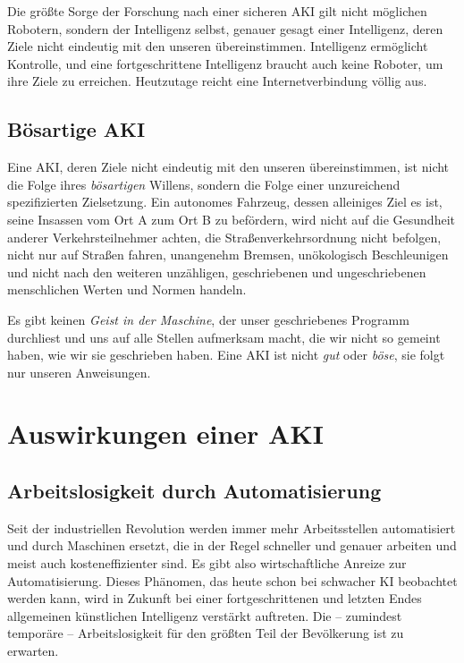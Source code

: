 Die größte Sorge der Forschung nach einer sicheren AKI gilt nicht möglichen Robotern, sondern der Intelligenz selbst, genauer gesagt einer Intelligenz, deren Ziele nicht eindeutig mit den unseren übereinstimmen. Intelligenz ermöglicht Kontrolle, und eine fortgeschrittene Intelligenz braucht auch keine Roboter, um ihre Ziele zu erreichen. Heutzutage reicht eine Internetverbindung völlig aus. 
\subsection{Bösartige AKI} \label{bösartigeKI}
Eine AKI, deren Ziele nicht eindeutig mit den unseren übereinstimmen, ist nicht die Folge ihres \emph{bösartigen} Willens, sondern die Folge einer unzureichend spezifizierten Zielsetzung. Ein autonomes Fahrzeug, dessen alleiniges Ziel es ist, seine Insassen vom Ort A zum Ort B zu befördern, wird nicht auf die Gesundheit anderer Verkehrsteilnehmer achten, die Straßenverkehrsordnung nicht befolgen, nicht nur auf Straßen fahren, unangenehm Bremsen, unökologisch Beschleunigen und nicht nach den weiteren unzähligen, geschriebenen und ungeschriebenen menschlichen Werten und Normen handeln.

Es gibt keinen \emph{Geist in der Maschine}, der unser geschriebenes Programm durchliest und uns auf alle Stellen aufmerksam macht, die wir nicht so gemeint haben, wie wir sie geschrieben haben. Eine AKI ist nicht \emph{gut} oder \emph{böse}, sie folgt nur unseren Anweisungen. 

\section{Auswirkungen einer AKI}
\subsection{Arbeitslosigkeit durch Automatisierung}
Seit der industriellen Revolution werden immer mehr Arbeitsstellen automatisiert und durch Maschinen ersetzt, die in der Regel schneller und genauer arbeiten und meist auch kosteneffizienter sind. Es gibt also wirtschaftliche Anreize zur Automatisierung. Dieses Phänomen, das heute schon bei schwacher KI beobachtet werden kann, wird in Zukunft bei einer fortgeschrittenen und letzten Endes allgemeinen künstlichen Intelligenz verstärkt auftreten. Die -- zumindest temporäre -- Arbeitslosigkeit für den größten Teil der Bevölkerung ist zu erwarten. 

